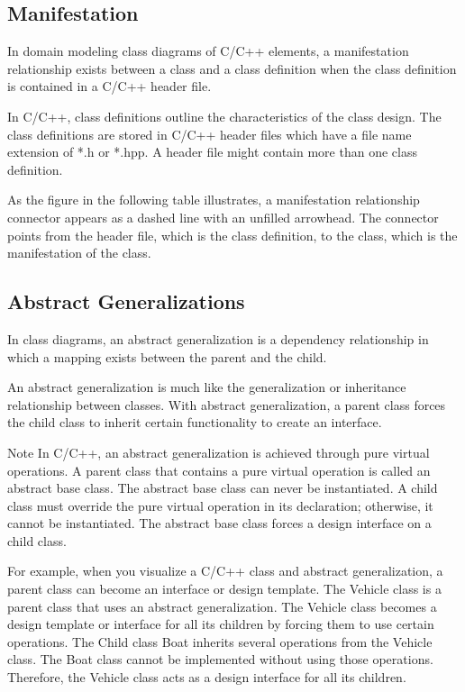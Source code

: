 \documentclass{book}
\begin{document}
\subsection{Manifestation}
In domain modeling class diagrams of C/C++ elements, a manifestation relationship exists between a class and a class definition when the class definition is contained in a C/C++ header file.

In C/C++, class definitions outline the characteristics of the class design. 
The class definitions are stored in C/C++ header files which have a file name extension of *.h or *.hpp. A header file might contain more than one class definition.

As the figure in the following table illustrates, a manifestation relationship connector appears as a dashed line with an unfilled arrowhead.
The connector points from the header file, which is the class definition, to the class, which is the manifestation of the class.

\begin{figure}[H]
\begin{floatrow}
\end{floatrow}
\end{figure}

\subsection{Abstract Generalizations}
In class diagrams, an abstract generalization is a dependency relationship in which a mapping exists between the parent and the child.

An abstract generalization is much like the generalization or inheritance relationship between classes.
With abstract generalization, a parent class forces the child class to inherit certain functionality to create an interface.

Note
In C/C++, an abstract generalization is achieved through pure virtual operations.
A parent class that contains a pure virtual operation is called an abstract base class.
The abstract base class can never be instantiated.
A child class must override the pure virtual operation in its declaration; otherwise, it cannot be instantiated.
The abstract base class forces a design interface on a child class.

For example, when you visualize a C/C++ class and abstract generalization, a parent class can become an interface or design template.
The Vehicle class is a parent class that uses an abstract generalization.
The Vehicle class becomes a design template or interface for all its children by forcing them to use certain operations.
The Child class Boat inherits several operations from the Vehicle class.
The Boat class cannot be implemented without using those operations. Therefore, the Vehicle class acts as a design interface for all its children.
\end{document}
